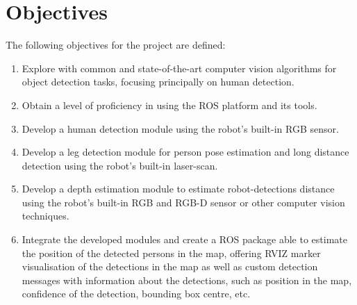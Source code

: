 \section{Objectives}

The following objectives for the project are defined:

\begin{enumerate}
  \item Explore with common and state-of-the-art computer vision algorithms for object detection tasks, focusing principally on human detection.
  \item Obtain a level of proficiency in using the ROS platform and its tools.
  \item Develop a human detection module using the robot's built-in RGB sensor.
  \item Develop a leg detection module for person pose estimation and long distance detection using the robot's built-in laser-scan.
  \item Develop a depth estimation module to estimate robot-detections distance using the robot's built-in RGB and RGB-D sensor or other computer vision techniques.
  \item Integrate the developed modules and create a ROS package able to estimate the position of the detected persons in the map, offering RVIZ marker visualisation of the detections in the map as well as custom detection messages with information about the detections, such as position in the map, confidence of the detection, bounding box centre, etc.
\end{enumerate}